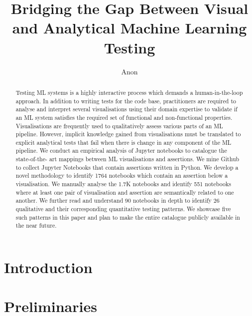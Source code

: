 \documentclass[acmsmall,screen,review,anonymous]{acmart}
\begin{document}
\title{Bridging the Gap Between Visual and Analytical Machine Learning Testing}

\author{Anon}

\begin{abstract}
Testing ML systems is a highly interactive process which demands a human-in-the-loop approach. In addition to writing tests for the code base, practitioners are required to analyse and interpret several visualisations using their domain expertise to validate if an ML system satisfies the required set of functional and non-functional properties. Visualisations are frequently used to qualitatively assess various parts of an ML pipeline. However, implicit knowledge gained from visualisations must be translated to explicit analytical tests that fail when there is change in any component of the ML pipeline. We conduct an empirical analysis of Jupyter notebooks to catalogue the state-of-the- art mappings between ML visualisations and assertions. We mine Github to collect Jupyter Notebooks that contain assertions written in Python. We develop a novel methodology to identify 1764 notebooks which contain an assertion below a visualisation. We manually analyse the 1.7K notebooks and identify 551 notebooks where at least one pair of visualisation and assertion are semantically related to one another. We further read and understand 90 notebooks in depth to identify 26 qualitative and their corresponding quantitative testing patterns. We showcase five such patterns in this paper and plan to make the entire catalogue publicly available in the near future.

\end{abstract}

\maketitle

\section{Introduction}\label{sec:intro}


\section{Preliminaries}\label{sec:prelim}
\end{document}
